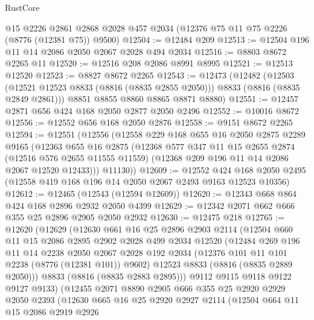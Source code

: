 \begin{lexlean}{RustCore}
\begin{coremodule}
    @15
    @2226
    @2861
    @2868
    @2028
    @457
    @2034
    (@12376 @75 @11 @75 @2226 (@8776 (@12381 @75)) @9500)
@12504 := @12484 @209
@12513 := @12504 @196 @11 @14 @2086 @2050 @2067 @2028 @494 @2034
@12516 := @8803 @8672 @2265 @11
@12520 := @12516 @208 @2086 @8991 @8995
@12521 := @12513 @12520
@12523 := @8827 @8672 @2265
@12543 := @12473
    (@12482
      (@12503 (@12521 @12523 @8833 (@8816 (@8835 @2855 @2050))) @8833 (@8816 (@8835 @2849 @2861)))
      @8851
      @8855
      @8860
      @8865
      @8871
      @8880)
@12551 := @12457 @2871 @656 @424 @168 @2050 @2877 @2050 @2496
@12552 := @10016 @8672
@12556 := @12552 @656 @168 @2050 @2876
@12558 := @9151 @8672 @2265
@12594 := @12551
    (@12556
      (@12558
        @229
        @168
        @655
        @16
        @2050
        @2875
        @2289
        @9165
        (@12363
          @655
          @16
          @2875
          (@12368
            @577
            @347
            @11
            @15
            @2655
            @2874
            (@12516 @576 @2655 @11555 @11559)
            (@12368 @209 @196 @11 @14 @2086 @2067 @12520 @12433)))
        @11130))
@12609 := @12552
    @424
    @168
    @2050
    @2495
    (@12558 @419 @168 @196 @14 @2050 @2067 @2493 @9163 @12523 @10356)
@12612 := @12465 (@12543 (@12594 @12609))
@12620 := @12343 @668 @864 @424 @168 @2896 @2932 @2050 @4399
@12629 := @12342 @2071 @662 @666 @355 @25 @2896 @2905 @2050 @2932
@12630 := @12475 @218
@12765 := @12620
    (@12629
      (@12630
        @661
        @16
        @25
        @2896
        @2903
        @2114
        (@12504
          @660
          @11
          @15
          @2086
          @2895
          @2902
          @2028
          @499
          @2034
          @12520
          (@12484
            @269
            @196
            @11
            @14
            @2238
            @2050
            @2067
            @2028
            @192
            @2034
            (@12376 @101 @11 @101 @2238 (@8776 (@12381 @101)) @9602)
            @12523
            @8833
            (@8816 (@8835 @2889 @2050)))
          @8833
          (@8816 (@8835 @2883 @2895)))
        @9112
        @9115
        @9118
        @9122
        @9127
        @9133)
      (@12455
        @2071
        @8890
        @2905
        @666
        @355
        @25
        @2920
        @2929
        @2050
        @2393
        (@12630
          @665
          @16
          @25
          @2920
          @2927
          @2114
          (@12504
            @664
            @11
            @15
            @2086
            @2919
            @2926

\end{coremodule}
\end{lexlean}
